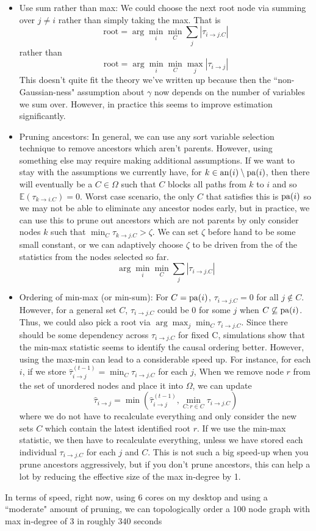 \documentclass[]{article}
\newcommand{\an}{{\rm an}}       %
\newcommand{\pa}{{\rm pa}}       %
\begin{document}
\begin{itemize}
\item Use sum rather than max: We could choose the next root node via summing over $j \neq i$ rather than simply taking the max. That is
\[\text{root} = \arg\min_i \min_C \sum_j  |\tau_{i\rightarrow j.C}|\] rather than
\[\text{root} = \arg \min_i \min_C \max_j |\tau_{i\rightarrow j}|\]
This doesn't quite fit the theory we've written up because then the ``non-Gaussian-ness" assumption about $\gamma$ now depends on the number of variables we sum over. However, in practice this seems to improve estimation significantly.
\item Pruning ancestors: In general, we can use any sort variable selection technique to remove ancestors which aren't parents. However, using something else may require making additional assumptions. If we want to stay with the assumptions we currently have, for $k \in \an(i) \setminus \pa(i)$, then there will eventually be a $C \in \Omega$ such that $C$ blocks all paths from $k$ to $i$ and so $\mathbb{E}(\tau_{k \rightarrow i.C}) = 0$. Worst case scenario, the only $C$ that satisfies this is $\pa(i)$ so we may not be able to eliminate any ancestor nodes early, but in practice, we can use this to prune out ancestors which are not parents by only consider nodes $k$ such that $\min_C \tau_{k \rightarrow j.C} > \zeta$. We can set $\zeta$ before hand to be some small constant, or we can adaptively choose $\zeta$ to be driven from the of the statistics from the nodes selected so far.
\[\arg\min_i \min_C \sum_j  |\tau_{i\rightarrow j.C}|\]
\item Ordering of min-max (or min-sum): For $C = \pa(i)$, $ \tau_{i\rightarrow j.C} = 0$ for all $j \not\in C$. However, for a general set $C$, $\tau_{i \rightarrow j.C}$ could be 0 for some $j$ when $C \not \subseteq \pa(i)$. Thus, we could also pick a root via $\arg \max_j \min_C \tau_{i\rightarrow j.C}$. Since there should be some dependency across $\tau_{i\rightarrow j.C}$ for fixed C, simulations show that the min-max statistic seems to identify the causal ordering better. However, using the max-min can lead to a considerable speed up. For instance, for each $i$, if we store $\hat \tau_{i \rightarrow j}^{(t-1)} = \min_C \tau_{i \rightarrow j.C}$ for each $j$, When we remove node $r$ from the set of unordered nodes and place it into $\Omega$, we can update
\[\hat \tau_{i \rightarrow j} = \min\left(\hat \tau_{i \rightarrow j}^{(t-1)}, \min_{C: r \in C} \tau_{i \rightarrow j.C}\right)\] where we do not have to recalculate everything and only consider the new sets $C$ which contain the latest identified root $r$. If we use the min-max statistic, we then have to recalculate everything, unless we have stored each individual $\tau_{i\rightarrow j.C}$ for each $j$ and $C$. This is not such a big speed-up when you prune ancestors aggressively, but if you don't prune ancestors, this can help a lot by reducing the effective size of the max in-degree by 1.
\end{itemize}

In terms of speed, right now, using 6 cores on my desktop and using a ``moderate" amount of pruning, we can topologically order a 100 node graph with max in-degree of 3 in roughly 340 seconds
\end{document}
